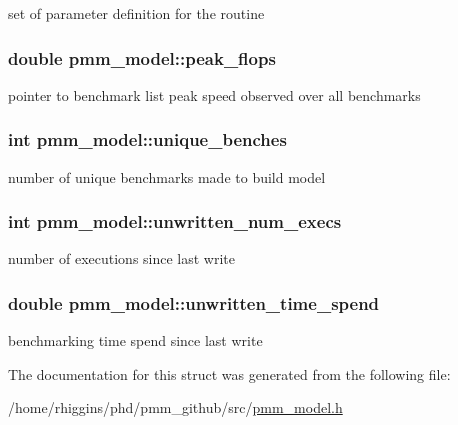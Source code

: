 set of parameter definition for the routine \hypertarget{structpmm__model_a71f976917c0db11c7a5a9b8efe0aaf93}{
\subsubsection[{peak\-\_\-flops}]{\setlength{\rightskip}{0pt plus 5cm}double pmm\-\_\-model\-::peak\-\_\-flops}}\label{structpmm__model_a71f976917c0db11c7a5a9b8efe0aaf93}
pointer to benchmark list peak speed observed over all benchmarks \hypertarget{structpmm__model_abcba0be210c29849b2594efb1dee7611}{
\subsubsection[{unique\-\_\-benches}]{\setlength{\rightskip}{0pt plus 5cm}int pmm\-\_\-model\-::unique\-\_\-benches}}\label{structpmm__model_abcba0be210c29849b2594efb1dee7611}
number of unique benchmarks made to build model \hypertarget{structpmm__model_a63d3fe02fc90ce9f48b6aae94ef25dfc}{
\subsubsection[{unwritten\-\_\-num\-\_\-execs}]{\setlength{\rightskip}{0pt plus 5cm}int pmm\-\_\-model\-::unwritten\-\_\-num\-\_\-execs}}\label{structpmm__model_a63d3fe02fc90ce9f48b6aae94ef25dfc}
number of executions since last write \hypertarget{structpmm__model_a6a06f632cf4913a674b29808622dbd39}{
\subsubsection[{unwritten\-\_\-time\-\_\-spend}]{\setlength{\rightskip}{0pt plus 5cm}double pmm\-\_\-model\-::unwritten\-\_\-time\-\_\-spend}}\label{structpmm__model_a6a06f632cf4913a674b29808622dbd39}
benchmarking time spend since last write 

The documentation for this struct was generated from the following file\-:\begin{DoxyCompactItemize}
\item 
/home/rhiggins/phd/pmm\-\_\-github/src/\hyperlink{pmm__model_8h}{pmm\-\_\-model.\-h}\end{DoxyCompactItemize}
